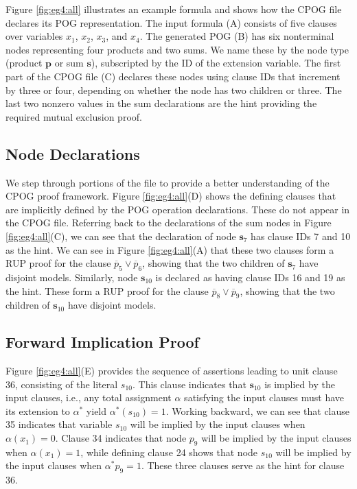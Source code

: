\documentclass[twoside,11pt]{article}
\newcommand{\obar}[1]{\overline{#1}}
\newcommand{\extend}[1]{#1^{*}}
\newcommand{\assign}{\alpha}
\newcommand{\eassign}{\extend{\alpha}}
\newcommand{\makenode}[1]{\mathbf{#1}}
\newcommand{\nodes}{\makenode{s}}
\newcommand{\nodep}{\makenode{p}}
\begin{document}
Figure \ref{fig:eg4:all} illustrates an example formula and shows how
the CPOG file declares its POG representation.  The input formula (A)
consists of five clauses over variables $x_1$, $x_2$, $x_3$, and
$x_4$.  The generated POG (B) has six nonterminal nodes representing
four products and two sums.  We name these by the node
type (product $\nodep$ or sum $\nodes$), subscripted by the ID of the
extension variable.
  The first part of the CPOG file (C) declares
these nodes using clause IDs that increment by three or four,
depending on whether the node has two children or three.  The last two
nonzero values in the sum declarations are the hint providing the
required mutual exclusion proof.

\subsection{Node Declarations}

We step through portions of the file to provide a better understanding of the CPOG proof framework.
Figure
\ref{fig:eg4:all}(D) shows the defining clauses that are implicitly
defined by the POG operation declarations.  These do not appear in the
CPOG file.  Referring back to the declarations of the sum nodes in
Figure \ref{fig:eg4:all}(C), we can see that the declaration of node
$\nodes_7$ has clause IDs 7 and 10 as the hint.  We can see in Figure
\ref{fig:eg4:all}(A) that these two clauses form a RUP proof for the clause
$\obar{p}_5 \lor \obar{p}_6$, showing that the two children of $\nodes_7$
have disjoint models.  Similarly, node $\nodes_{10}$ is declared as having
clause IDs 16 and 19 as the hint.  These form a RUP proof for the clause
$\obar{p}_8 \lor \obar{p}_9$, showing that the two children of
$\nodes_{10}$ have disjoint models.

\subsection{Forward Implication Proof}

Figure \ref{fig:eg4:all}(E) provides the sequence of assertions
leading to unit clause 36, consisting of the literal $s_{10}$.  This clause indicates that $\nodes_{10}$ is implied by the input clauses, i.e.,
any total assignment $\assign$
satisfying the input clauses must have its extension to $\eassign$ yield $\eassign(s_{10}) = 1$.
Working backward, we can see that
clause 35 indicates that variable $s_{10}$ will be implied by the input
clauses when $\assign(x_1) = 0$. Clause 34 indicates that node $p_9$ will
be implied by the input clauses when $\assign(x_1) = 1$, while defining clause 24 shows that node $s_{10}$ will be implied
by the input clauses when $\eassign{p_9} = 1$.  These three clauses
serve as the
hint for clause 36.
\end{document}
